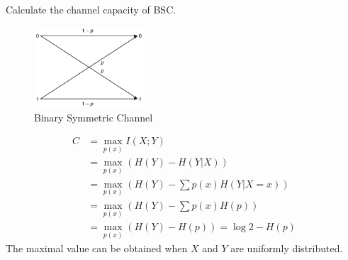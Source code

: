 \begin{exercise}[BSC]{Calculate the channel capacity of BSC.
  \begin{figure}[H]
    \centering
    \includegraphics[height=3cm]{img/6-1.png}
    \caption{Binary Symmetric Channel}
    \label{fig:bsc}
  \end{figure}}
  \begin{solution}
  \begin{equation}\begin{aligned}
    C &=\max_{p(x)} I(X ; Y) \\
    &=\max_{p(x)} (H(Y)-H(Y | X) )\\
    &=\max_{p(x)} (H(Y)-\sum p(x) H(Y | X=x) )\\
    &=\max_{p(x)} (H(Y)-\sum p(x) H(p)) \\
    &=\max_{p(x)} (H(Y) - H(p)) = \log 2 - H(p)
    \end{aligned}\end{equation}
  The maximal value can be obtained when $X$ and $Y$ are uniformly distributed.
  \end{solution}
  \label{ex1}
\end{exercise}

